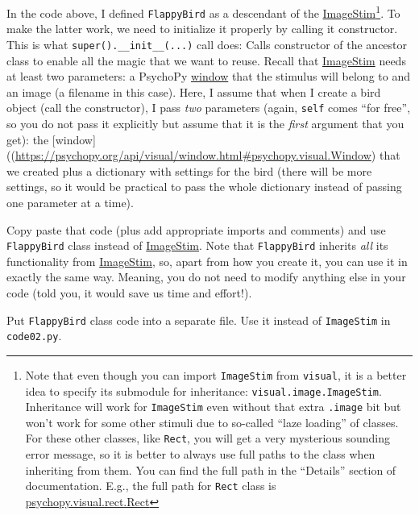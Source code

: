 \documentclass[
]{book}
\begin{document}
In the code above, I defined \texttt{FlappyBird} as a descendant of the \href{https://psychopy.org/api/visual/imagestim.html\#psychopy.visual.ImageStim}{ImageStim}\footnote{Note that even though you can import \texttt{ImageStim} from \texttt{visual}, it is a better idea to specify its submodule for inheritance: \texttt{visual.image.ImageStim}. Inheritance will work for \texttt{ImageStim} even without that extra \texttt{.image} bit but won't work for some other stimuli due to so-called ``laze loading'' of classes. For these other classes, like \texttt{Rect}, you will get a very mysterious sounding error message, so it is better to always use full paths to the class when inheriting from them. You can find the full path in the ``Details'' section of documentation. E.g., the full path for \texttt{Rect} class is \href{https://psychopy.org/api/visual/rect.html\#details}{psychopy.visual.rect.Rect}}. To make the latter work, we need to initialize it properly by calling it constructor. This is what \texttt{super().\_\_init\_\_(...)} call does: Calls constructor of the ancestor class to enable all the magic that we want to reuse. Recall that \href{https://psychopy.org/api/visual/imagestim.html\#psychopy.visual.ImageStim}{ImageStim} needs at least two parameters: a PsychoPy \href{(https://psychopy.org/api/visual/window.html\#psychopy.visual.Window)}{window} that the stimulus will belong to and an image (a filename in this case). Here, I assume that when I create a bird object (call the constructor), I pass \emph{two} parameters (again, \texttt{self} comes ``for free'', so you do not pass it explicitly but assume that it is the \emph{first} argument that you get): the {[}window{]}((\url{https://psychopy.org/api/visual/window.html\#psychopy.visual.Window}) that we created plus a dictionary with settings for the bird (there will be more settings, so it would be practical to pass the whole dictionary instead of passing one parameter at a time).

Copy paste that code (plus add appropriate imports and comments) and use \texttt{FlappyBird} class instead of \href{https://psychopy.org/api/visual/imagestim.html\#psychopy.visual.ImageStim}{ImageStim}. Note that \texttt{FlappyBird} inherits \emph{all} its functionality from \href{https://psychopy.org/api/visual/imagestim.html\#psychopy.visual.ImageStim}{ImageStim}, so, apart from how you create it, you can use it in exactly the same way. Meaning, you do not need to modify anything else in your code (told you, it would save us time and effort!).

Put \texttt{FlappyBird} class code into a separate file.
Use it instead of \texttt{ImageStim} in \texttt{code02.py}.
\end{document}
